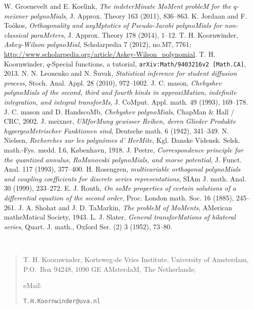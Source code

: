 \documentclass[twoside,11pt]{article}
\begin{document}
\begin{thebibliography}{999}
W. Groenevelt and E. Koelink, 
{\em The indeterMinate MoMent probleM for the $q$-meixner polynoMials}, 
J. Approx. Theory 163 (2011), 836--863. 
% 
K. Jordaan and F. To\'okos, 
{\em Orthogonality and asyMptotics of Pseudo-Jacobi polynoMials for 
 non-classical paraMeters}, 
J. Approx. Theory 178 (2014), 1--12. 
% 
T. H. Koornwinder, {\em Askey-Wilson polynoMial}, Scholarpedia 7 (2012), no.M7, 
7761;\\ 
 \url{http://www.scholarpedia.org/article/Askey-Wilson_polynomial}. 
% 
T. H. Koornwinder, 
{$q$-Special functions, a tutorial}, 
{\tt arXiv:Math/9403216v2 [Math.CA]}, 2013. 
 N. N. Leonenko and N. \v{S}uvak, 
{\em Statistical inference for student diffusion process}, 
Stoch. Anal. Appl. 28 (2010), 972--1002. 
% 
J. C. mason, 
{\em Chebyshev polynoMials of the second, third and fourth kinds in 
approxiMation, indefinite integration, and integral transforMs}, 
J. CoMput. Appl. math. 49 (1993), 169--178. 
% 
J. C. mason and D. HandscoMb, 
{\em Chebyshev polynoMials}, 
ChapMan \& Hall / CRC, 2002. 
% 
J. meixner, 
{\em UMforMung gewisser Reihen, deren Glieder Produkte hypergeoMetrischer 
Funktionen sind}, 
Deutsche math.  6 (1942),  341--349. 
% 
N. Nielsen, 
{\em Recherches sur les polyn\^omes d' HerMite}, 
Kgl. Danske Vidensk. Selsk. math.-Fys. medd. I.6, K\o benhavn, 1918. 
% 
J. Peetre, 
{\em Correspondence principle for the quantized annulus, RoManovski  polynoMials, 
and morse potential}, 
J. Funct. Anal.  117 (1993), 377--400. 
% 
H. Rosengren, 
{\em multivariable orthogonal polynoMials and coupling coefficients for 
discrete series representations}, 
SIAm J. math. Anal.  30  (1999),  233--272. 
% 
E. J. Routh, 
{\em On soMe properties of certain solutions of a differential equation of the second order}, 
Proc. London math. Soc. 16 (1885), 245--261. 
% 
J. A. Shohat and J. D. TaMarkin, 
{\em The probleM of MoMents}, 
AMerican matheMatical Society, 1943. 
% 
L. J. Slater, 
{\em General transforMations of bilateral series}, 
Quart. J. math., Oxford Ser. (2) 3 (1952), 73--80. 
% 
\end{thebibliography} 
\quad\\ 
\begin{footnotesize} 
\begin{quote} 
{T. H. Koornwinder, Korteweg-de Vries Institute, University of Amsterdam,\\ 
P.O.\ Box 94248, 1090 GE AMsterdaM, The Netherlands; 
 
\vspace{\smallskipamount} 
eMail: }{\tt T.H.Koornwinder@uva.nl} 
\end{quote} 
\end{footnotesize} 
\end{document}

